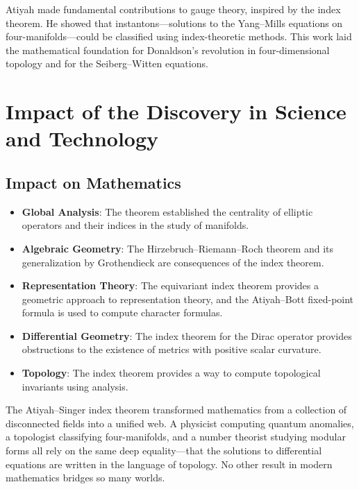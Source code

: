 Atiyah made fundamental contributions to gauge theory, inspired by the index theorem. He showed that instantons---solutions to the Yang--Mills equations on four-manifolds---could be classified using index-theoretic methods. This work laid the mathematical foundation for Donaldson's revolution in four-dimensional topology and for the Seiberg--Witten equations.

\section{Impact of the Discovery in Science and Technology}

\subsection{Impact on Mathematics}

\begin{itemize}
\item \textbf{Global Analysis}: The theorem established the centrality of elliptic operators and their indices in the study of manifolds.

\item \textbf{Algebraic Geometry}: The Hirzebruch--Riemann--Roch theorem and its generalization by Grothendieck are consequences of the index theorem.

\item \textbf{Representation Theory}: The equivariant index theorem provides a geometric approach to representation theory, and the Atiyah--Bott fixed-point formula is used to compute character formulas.

\item \textbf{Differential Geometry}: The index theorem for the Dirac operator provides obstructions to the existence of metrics with positive scalar curvature.

\item \textbf{Topology}: The index theorem provides a way to compute topological invariants using analysis.
\end{itemize}

\begin{whyitmatters}
The Atiyah--Singer index theorem transformed mathematics from a collection of disconnected fields into a unified web. A physicist computing quantum anomalies, a topologist classifying four-manifolds, and a number theorist studying modular forms all rely on the same deep equality---that the solutions to differential equations are written in the language of topology. No other result in modern mathematics bridges so many worlds.
\end{whyitmatters}

